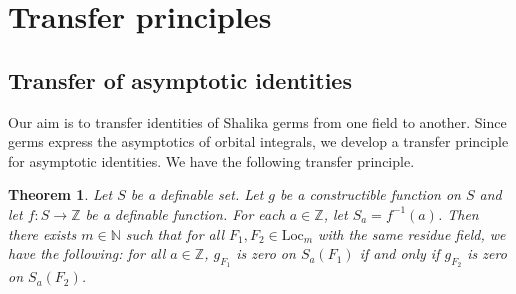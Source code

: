 \documentclass[12pt]{amsart}
\newcommand{\ring}[1]{{\mathbb #1}}
\newcommand{\Loc}{\mathrm{Loc}}
\theoremstyle{plain}
\newtheorem{theorem}[thm]{Theorem}
\theoremstyle{definition}
\begin{document}
\section{Transfer principles}\label{sec:tp}

\subsection{Transfer of asymptotic identities}

Our aim is to transfer identities of Shalika germs from
one field to another.  Since germs express the asymptotics of
orbital integrals, we develop a transfer principle for
asymptotic identities.  We have the following transfer principle.

\begin{theorem} \label{thm:asym}
Let $S$ be a definable set.    
Let $g$ be a constructible function on $S$ and let
  $f:S\to \ring{Z}$ be a definable function.  For each $a\in\ring{Z}$,
let $S_a = f^{-1}(a)$.  Then there exists 
  $m\in\ring{N}$ such that for all $F_1,F_2\in\Loc_m$ with the same
  residue field, we have the following: for all $a\in\ring{Z}$, 
  $g_{F_1}$ is zero on $S_a(F_1)$ if and only if $g_{F_2}$ is zero
  on $S_a(F_2)$.
\end{theorem}
\end{document}
